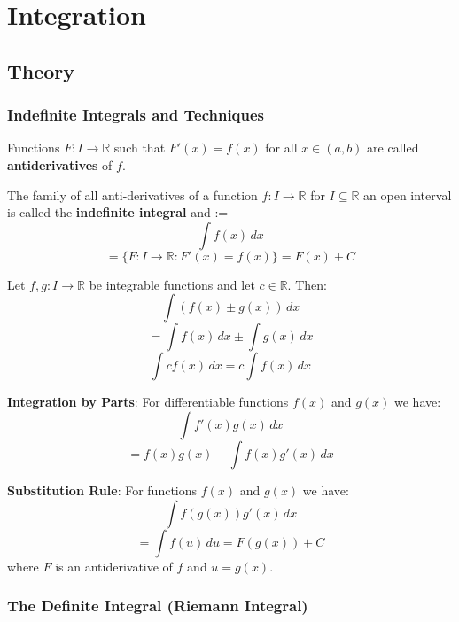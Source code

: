 \section{Integration}

\subsection{Theory}

\subsubsection{Indefinite Integrals and Techniques}

\begin{definition}
    Functions $F: I \to \mathbb{R}$ such that $F'(x) = f(x)$ for all $x \in (a, b)$ are called \textbf{antiderivatives} of $f$.
\end{definition}

\begin{definition}
    The family of all anti-derivatives of a function $f: I \to \mathbb{R}$ for $I \subseteq \mathbb{R}$ an open interval is called the \textbf{indefinite integral} and :=
    $$\int f(x) \, dx$$
    $$= \{ F: I \to \mathbb{R} : F'(x) = f(x) \} = F(x) + C$$
\end{definition}

\begin{theorem}
    Let $f, g: I \to \mathbb{R}$ be integrable functions and let $c \in \mathbb{R}$. Then:
    $$\int (f(x) \pm g(x)) \, dx$$
    $$= \int f(x) \, dx \pm \int g(x) \, dx$$
    $$\int c f(x) \, dx = c \int f(x) \, dx$$
\end{theorem}

\begin{theorem}
    \textbf{Integration by Parts}: For differentiable functions $f(x)$ and $g(x)$ we have:
    $$\int f'(x)g(x) \, dx$$
    $$= f(x)g(x) - \int f(x)g'(x) \, dx$$
\end{theorem}

\begin{theorem}
    \textbf{Substitution Rule}: For functions $f(x)$ and $g(x)$ we have:
    $$\int f(g(x))g'(x) \, dx$$
    $$= \int f(u) \, du = F(g(x)) + C$$
    where $F$ is an antiderivative of $f$ and $u = g(x)$.
\end{theorem}

\subsubsection{The Definite Integral (Riemann Integral)}

